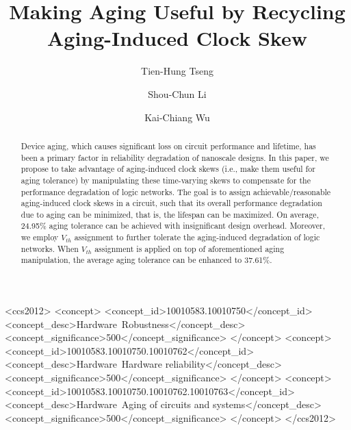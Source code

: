 \documentclass[format=acmsmall, review=false, screen=true]{acmart}
\begin{document}
\title[Making Aging Useful by Recycling Aging-Induced Clock Skew]{\fontsize{14}{10}\selectfont Making Aging Useful by Recycling Aging-Induced Clock Skew}


\author{Tien-Hung Tseng}


\author{Shou-Chun Li}


\author{Kai-Chiang Wu}



\begin{abstract}
Device aging, which causes significant loss on circuit performance and lifetime, has been a primary factor in reliability degradation of nanoscale designs. In this paper, we propose to take advantage of aging-induced clock skews (i.e., make them useful for aging tolerance) by manipulating these time-varying skews to compensate for the performance degradation of logic networks. The goal is to assign achievable/reasonable aging-induced clock skews in a circuit, such that its overall performance degradation due to aging can be minimized, that is, the lifespan can be maximized.  On average, 24.95\% aging tolerance can be achieved with insignificant design overhead. Moreover, we employ $V_{th}$ assignment to further tolerate the aging-induced degradation of logic networks. When $V_{th}$ assignment is applied on top of aforementioned aging manipulation, the average aging tolerance can be enhanced to 37.61\%.
\end{abstract}


\begin{CCSXML}
<ccs2012>
<concept>
<concept_id>10010583.10010750</concept_id>
<concept_desc>Hardware~Robustness</concept_desc>
<concept_significance>500</concept_significance>
</concept>
<concept>
<concept_id>10010583.10010750.10010762</concept_id>
<concept_desc>Hardware~Hardware reliability</concept_desc>
<concept_significance>500</concept_significance>
</concept>
<concept>
<concept_id>10010583.10010750.10010762.10010763</concept_id>
<concept_desc>Hardware~Aging of circuits and systems</concept_desc>
<concept_significance>500</concept_significance>
</concept>
</ccs2012>
\end{CCSXML}
\end{document}
